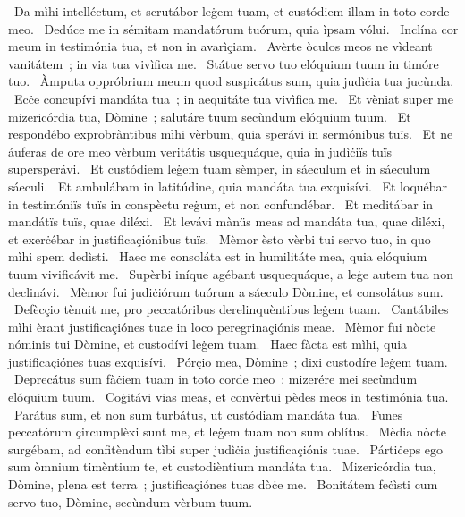 ~Da mìhi intelléctum, et scrutábor leġem tuam, et custódiem illam in toto corde meo. 
~Dedúce me in sémitam mandatórum tuórum, quia ìpsam vólui. 
~Inclína cor meum in testimónia tua, et non in avarìçiam. 
~Avèrte òculos meos ne vìdeant vanitátem~; in via tua vivìfica me. 
~Státue servo tuo elóquium tuum in timóre tuo. 
~Àmputa oppróbrium meum quod suspicátus sum, quia judìċia tua jucùnda. 
~Ecċe concupívi mandáta tua~; in aequitáte tua vivìfica me. 
~Et vèniat super me mizericórdia tua, Dòmine~; salutáre tuum secùndum elóquium tuum. 
~Et respondébo exprobràntibus mìhi vèrbum, quia sperávi in sermónibus tuïs. 
~Et ne áuferas de ore meo vèrbum veritátis usquequáque, quia in judìċiïs tuïs supersperávi. 
~Et custódiem leġem tuam sèmper, in sáeculum et in sáeculum sáeculi. 
~Et ambulábam in latitúdine, quia mandáta tua exquisívi. 
~Et loquébar in testimóniïs tuïs in conspèctu reġum, et non confundébar. 
~Et meditábar in mandátïs tuïs, quae diléxi. 
~Et levávi mànüs meas ad mandáta tua, quae diléxi, et exerċébar in justificaçiónibus tuïs. 
~Mèmor èsto vèrbi tui servo tuo, in quo mìhi spem dedìsti. 
~Haec me consoláta est in humilitáte mea, quia elóquium tuum vivificávit me. 
~Supèrbi iníque agébant usquequáque, a leġe autem tua non declinávi. 
~Mèmor fui judiċiórum tuórum a sáeculo Dòmine, et consolátus sum. 
~Defècçio tènuit me, pro peccatóribus derelinquèntibus leġem tuam. 
~Cantábiles mìhi èrant justificaçiónes tuae in loco peregrinaçiónis meae. 
~Mèmor fui nòcte nóminis tui Dòmine, et custodívi leġem tuam. 
~Haec fàcta est mìhi, quia justificaçiónes tuas exquisívi. 
~Pórçio mea, Dòmine~; dixi custodíre leġem tuam. 
~Deprecátus sum fàċiem tuam in toto corde meo~; mizerére mei secùndum elóquium tuum. 
~Coġitávi vias meas, et convèrtui pèdes meos in testimónia tua. 
~Parátus sum, et non sum turbátus, ut custódiam mandáta tua. 
~Funes peccatórum çircumplèxi sunt me, et leġem tuam non sum oblítus. 
~Mèdia nòcte surgébam, ad confitèndum tìbi super judìċia justificaçiónis tuae. 
~Pártiċeps ego sum òmnium timèntium te, et custodièntium mandáta tua. 
~Mizericórdia tua, Dòmine, plena est terra~; justificaçiónes tuas dòċe me. 
~Bonitátem feċìsti cum servo tuo, Dòmine, secùndum vèrbum tuum. 
